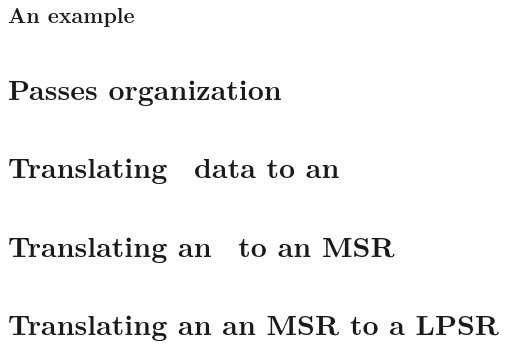 \documentclass[12pt,a4paper]{article}
\begin{document}
\subsection{An example}


\section{Passes organization}


\section{Translating \mxml\ data to an \mxmlt}


\section{Translating an \mxmlt\ to an MSR}


\section{Translating an an MSR to a LPSR}


\end{document}

